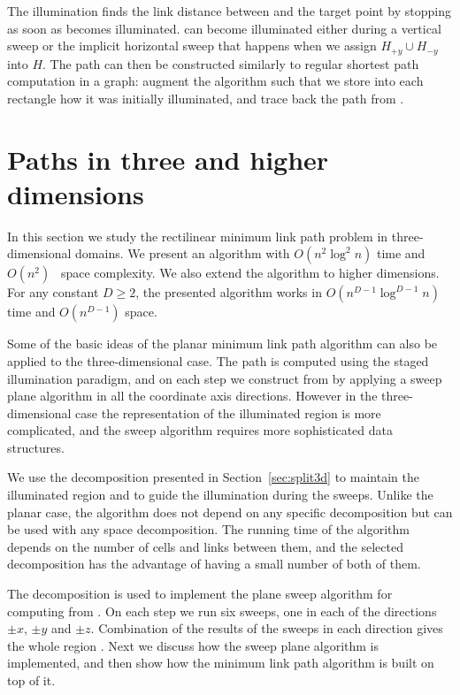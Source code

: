 \documentclass[english,gradu]{tktltiki2018}
\begin{document}
The illumination finds the link distance between \spt and the target point \ept by stopping as soon as \ept becomes illuminated.
\epts can become illuminated either during a vertical sweep or the implicit horizontal sweep that happens when we assign $H_{+y}\cup H_{-y}$ into $H$.
The path can then be constructed similarly to regular shortest path computation in a graph:
augment the algorithm such that we store into each rectangle how it was initially illuminated, and trace back the path from \ept.



\section{Paths in three and higher dimensions}\label{sec:minlink3d}

In this section we study the rectilinear minimum link path problem in three-dimensional domains.
We present an algorithm with $O(n^2\log^2 n)$ time and $O(n^2)$~\cite{restricted} space complexity.
We also extend the algorithm to higher dimensions.
For any constant $D\ge 2$, the presented algorithm works in $O(n^{D-1}\log^{D-1}n)$ time and $O(n^{D-1})$ space.

Some of the basic ideas of the planar minimum link path algorithm can also be applied to the three-dimensional case.
The path is computed using the staged illumination paradigm, and on each step we construct  from  by applying a sweep plane algorithm in all the coordinate axis directions.
However in the three-dimensional case the representation of the illuminated region is more complicated, and the sweep algorithm requires more sophisticated data structures.

We use the decomposition presented in Section~\ref{sec:split3d} to maintain the illuminated region and to guide the illumination during the sweeps.
Unlike the planar case, the algorithm does not depend on any specific decomposition but can be used with any space decomposition.
The running time of the algorithm depends on the number of cells and links between them, and the selected decomposition has the advantage of having a small number of both of them.

The decomposition is used to implement the plane sweep algorithm for computing  from .
On each step we run six sweeps, one in each of the directions $\pm x$, $\pm y$ and $\pm z$.
Combination of the results of the sweeps in each direction gives the whole region .
Next we discuss how the sweep plane algorithm is implemented, and then show how the minimum link path algorithm is built on top of it.
\end{document}
